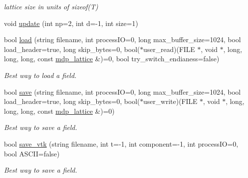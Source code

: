 \begin{CompactItemize}
\begin{CompactList}\small\item\em lattice size in units of sizeof(T) \item\end{CompactList}\item 
void \hyperlink{classmdp__field_72b973da706841ea58dc728345d36795}{update} (int np=2, int d=-1, int size=1)
\item 
\hypertarget{classmdp__field_9f7c113ef1dea753f54d88ff2b854c40}{
bool \hyperlink{classmdp__field_9f7c113ef1dea753f54d88ff2b854c40}{load} (string filename, int processIO=0, long max\_\-buffer\_\-size=1024, bool load\_\-header=true, long skip\_\-bytes=0, bool($\ast$user\_\-read)(FILE $\ast$, void $\ast$, long, long, long, const \hyperlink{classmdp__lattice}{mdp\_\-lattice} \&)=0, bool try\_\-switch\_\-endianess=false)}
\label{classmdp__field_9f7c113ef1dea753f54d88ff2b854c40}

\begin{CompactList}\small\item\em Best way to load a field. \item\end{CompactList}\item 
\hypertarget{classmdp__field_e0ada48bbeca95e43b5986e3016c25ef}{
bool \hyperlink{classmdp__field_e0ada48bbeca95e43b5986e3016c25ef}{save} (string filename, int processIO=0, long max\_\-buffer\_\-size=1024, bool load\_\-header=true, long skip\_\-bytes=0, bool($\ast$user\_\-write)(FILE $\ast$, void $\ast$, long, long, long, const \hyperlink{classmdp__lattice}{mdp\_\-lattice} \&)=0)}
\label{classmdp__field_e0ada48bbeca95e43b5986e3016c25ef}

\begin{CompactList}\small\item\em Best way to save a field. \item\end{CompactList}\item 
\hypertarget{classmdp__field_8ad4d41e9c53df910f114031f84e0845}{
bool \hyperlink{classmdp__field_8ad4d41e9c53df910f114031f84e0845}{save\_\-vtk} (string filename, int t=-1, int component=-1, int processIO=0, bool ASCII=false)}
\label{classmdp__field_8ad4d41e9c53df910f114031f84e0845}

\begin{CompactList}\small\item\em Best way to save a field. \item\end{CompactList}\end{CompactItemize}
